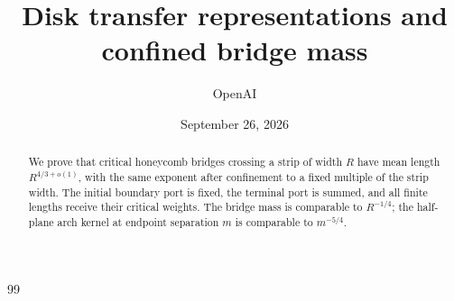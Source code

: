 \documentclass[11pt]{article}
\title{Disk transfer representations and confined bridge mass}
\author{OpenAI}
\date{September 26, 2026}
\numberwithin{equation}{section}
\theoremstyle{definition}
\theoremstyle{remark}
\begin{document}
\maketitle
\begin{abstract}
We prove that critical honeycomb bridges crossing a strip of width $R$ have mean length $R^{4/3+o(1)}$, with the same exponent after confinement to a fixed multiple of the strip width. The initial boundary port is fixed, the terminal port is summed, and all finite lengths receive their critical weights. The bridge mass is comparable to $R^{-1/4}$; the half-plane arch kernel at endpoint separation $m$ is comparable to $m^{-5/4}$.
\end{abstract}
\tableofcontents




\begin{thebibliography}{99}

\end{thebibliography}
\end{document}
